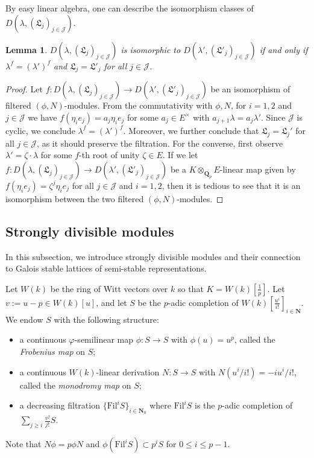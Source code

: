 \documentclass[11pt]{amsart}
\theoremstyle{definition}
\numberwithin{equation}{subsection}
\theoremstyle{plain}
\theoremstyle{plain}
\theoremstyle{plain}
\theoremstyle{plain}
\theoremstyle{plain}
\theoremstyle{plain}
\theoremstyle{plain}
\theoremstyle{plain}
\theoremstyle{plain}
\newtheorem{lemm}[equation]{Lemma}
\theoremstyle{plain}
\theoremstyle{plain}
\theoremstyle{plain}
\theoremstyle{definition}
\theoremstyle{definition}
\theoremstyle{definition}
\theoremstyle{remark}
\renewcommand{\(}{\textup{(}}
\renewcommand{\)}{\textup{)}}
\newcommand{\N}{\mathbf{N}}
\newcommand{\Q}{\mathbf{Q}}
\newcommand{\fL}{\mathfrak{L}}
\newcommand{\Fil}{\mathrm{Fil}}
\newcommand{\cJ}{\mathcal{J}}
\begin{document}
By easy linear algebra, one can describe the isomorphism classes of $D(\lambda,(\fL_j)_{j\in\cJ})$.

\begin{lemm}\label{lemm: isomorphism class of filtered phi N modules}
$D(\lambda,(\fL_j)_{j\in\cJ})$ is isomorphic to $D(\lambda',(\fL'_j)_{j\in\cJ})$ if and only if $\lambda^f=(\lambda')^f$ and $\fL_j=\fL'_j$ for all $j\in\cJ$.
\end{lemm}

\begin{proof}
Let $f:D(\lambda,(\fL_j)_{j\in\cJ})\rightarrow D(\lambda',(\fL'_j)_{j\in\cJ})$ be an isomorphism of filtered $(\phi,N)$-modules. From the commutativity with $\phi,N$, for $i=1,2$ and $j\in\cJ$ we have $f(\eta_ie_j)=a_{j}\eta_ie_j$ for some $a_{j}\in E^\times$ with $a_{j+1}\lambda=a_{j}\lambda'$. Since $\cJ$ is cyclic, we conclude $\lambda^f=(\lambda')^f$. Moreover, we further conclude that $\fL_j=\fL_j'$ for all $j\in\cJ$, as it should preserve the filtration. For the converse, first observe $\lambda'=\zeta\cdot\lambda$ for some $f$-th root of unity $\zeta\in E$. If we let $f:D(\lambda,(\fL_j)_{j\in\cJ})\rightarrow D(\lambda',(\fL'_j)_{j\in\cJ})$ be a $K\otimes_{\Q_p}E$-linear map given by $f(\eta_i e_j)=\zeta^{j}\eta_ie_j$ for all $j\in\cJ$ and $i=1,2$, then it is tedious to see that it is an isomorphism between the two filtered $(\phi,N)$-modules.
\end{proof}




\subsection{Strongly divisible modules}\label{subsec: strongly divisible modules, preliminary}
In this subsection, we introduce strongly divisible modules and their connection to Galois stable lattices of semi-stable representations.


Let $W(k)$ be the ring of Witt vectors over $k$ so that $K=W(k)[\frac{1}{p}]$. Let $v:=u-p\in W(k)[u]$, and let $S$ be the $p$-adic completion of $W(k)[\frac{u^{i}}{i!}]_{i\in\N}$. We endow $S$ with the following structure:
\begin{itemize}[leftmargin=*]
\item a continuous $\varphi$-semilinear map $\phi:S\rightarrow S$ with $\phi(u)=u^{p}$, called the \emph{Frobenius map} on $S$;
\item a continuous $W(k)$-linear derivation $N:S\rightarrow S$ with $N(u^{i}/i!)=-iu^{i}/i!$, called the \emph{monodromy map} on $S$;
\item a decreasing filtration $\{\Fil^{i}S\}_{i\in\N_{0}}$ where $\Fil^{i}S$ is the $p$-adic completion of $\sum_{j\geq i}\frac{v^{j}}{j!}S$.
\end{itemize}
Note that $N\phi=p\phi N$ and $\phi(\Fil^{i}S)\subset p^{i}S$ for $0\leq i\leq p-1$.
\end{document}
